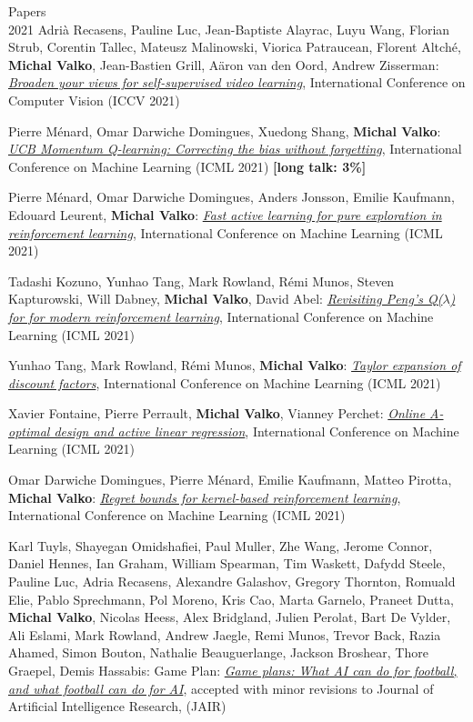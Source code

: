 \documentclass{resume}
\begin{document}
\begin{category}{Papers\\2021}
\citembullet
Adri\`a Recasens, Pauline Luc, Jean-Baptiste Alayrac, Luyu Wang, Florian Strub, Corentin Tallec, Mateusz Malinowski, Viorica Patraucean, Florent Altch\' e, {\bf Michal Valko}, Jean-Bastien Grill, A\"aron van den Oord, Andrew Zisserman: 
\href{https://arxiv.org/pdf/2103.16559.pdf}{\emph{Broaden your views for self-supervised video learning}},
International Conference on Computer Vision
({\sf ICCV 2021}) 


\citembullet
Pierre M\' enard,  Omar Darwiche Domingues, Xuedong Shang,  {\bf Michal Valko}:
\href{https://arxiv.org/pdf/2103.01312.pdf}{\emph{UCB Momentum Q-learning: Correcting the bias without forgetting}},
International Conference on Machine Learning
({\sf ICML 2021})  {\bf [long talk: 3\%]}

\citembullet
Pierre M\' enard,  Omar Darwiche Domingues, Anders Jonsson,  Emilie Kaufmann, Edouard Leurent, {\bf Michal Valko}:
\href{http://arxiv.org/abs/2007.13442.pdf}{\emph{Fast active learning for pure exploration in reinforcement learning}},
International Conference on Machine Learning
({\sf ICML 2021}) 


\citembullet
Tadashi Kozuno, Yunhao Tang, Mark Rowland, R\' emi Munos, Steven Kapturowski, Will Dabney, {\bf Michal Valko}, David Abel: 
\href{https://arxiv.org/pdf/2103.00107.pdf}{\emph{Revisiting Peng's Q($\lambda$) for for modern reinforcement learning}},
International Conference on Machine Learning
({\sf ICML 2021}) 

\citembullet
Yunhao Tang, Mark Rowland, R\' emi Munos, {\bf Michal Valko}: 
\href{https://arxiv.org/pdf/2106.06170.pdf}{\emph{Taylor expansion of discount factors}},
International Conference on Machine Learning
({\sf ICML 2021}) 

\citembullet
Xavier Fontaine, Pierre Perrault, {\bf Michal Valko}, Vianney Perchet:
\href{https://arxiv.org/pdf/1906.08509.pdf}{\emph{Online A-optimal design and active linear regression}},
International Conference on Machine Learning
({\sf ICML 2021}) 


\citembullet
Omar Darwiche Domingues, Pierre M\'enard, Emilie Kaufmann, Matteo Pirotta, {\bf Michal Valko}:
\href{https://arxiv.org/abs/2004.05599}{\emph{Regret bounds for kernel-based reinforcement learning}},
International Conference on Machine Learning
({\sf ICML 2021}) 


\citembullet
Karl Tuyls, Shayegan Omidshafiei, Paul Muller, Zhe Wang, Jerome Connor, Daniel Hennes, Ian Graham, William Spearman, Tim Waskett, Dafydd Steele, Pauline Luc, Adria Recasens, Alexandre Galashov, Gregory Thornton, Romuald Elie, Pablo Sprechmann, Pol Moreno, Kris Cao, Marta Garnelo, Praneet Dutta, {\bf Michal Valko}, Nicolas Heess, Alex Bridgland, Julien Perolat, Bart De Vylder, Ali Eslami, Mark Rowland, Andrew Jaegle, Remi Munos, Trevor Back, Razia Ahamed, Simon Bouton, Nathalie Beauguerlange, Jackson Broshear, Thore Graepel, Demis Hassabis: Game Plan: 
\href{https://arxiv.org/pdf/2011.09192.pdf}{\emph{Game plans: What AI can do for football, and what football can do for AI}},
accepted with minor revisions to Journal of Artificial Intelligence Research,
({\sf JAIR}) 



\end{category}
\end{document}

